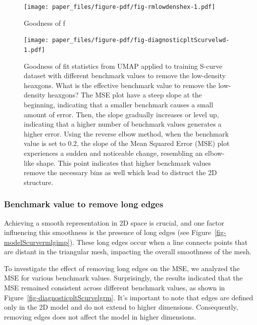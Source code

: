 \documentclass[
  12pt]{article}
\begin{document}
\begin{figure}

{\centering \texttt{[image: paper\_files/figure-pdf/fig-rmlowdenshex-1.pdf]}

}

\caption{\label{fig-rmlowdenshex}Goodness of f}

\end{figure}

\begin{figure}

{\centering \texttt{[image: paper\_files/figure-pdf/fig-diagnosticpltScurvelwd-1.pdf]}

}

\caption{\label{fig-diagnosticpltScurvelwd}Goodness of fit statistics
from UMAP applied to training S-curve dataset with different benchmark
values to remove the low-density heaxgons. What is the effective
benchmark value to remove the low-density heaxgons? The MSE plot have a
steep slope at the beginning, indicating that a smaller benchmark causes
a small amount of error. Then, the slope gradually increases or level
up, indicating that a higher number of benchmark values generates a
higher error. Using the reverse elbow method, when the benchmark value
is set to 0.2, the slope of the Mean Squared Error (MSE) plot
experiences a sudden and noticeable change, resembling an elbow-like
shape. This point indicates that higher benchmark values remove the
necessary bins as well which lead to distruct the 2D structure.}

\end{figure}

\hypertarget{benchmark-value-to-remove-long-edges}{%
\subsubsection{Benchmark value to remove long
edges}\label{benchmark-value-to-remove-long-edges}}

Achieving a smooth representation in 2D space is crucial, and one factor
influencing this smoothness is the presence of long edges (see
Figure~\ref{fig-modelScurvermlgimp}). These long edges occur when a line
connects points that are distant in the triangular mesh, impacting the
overall smoothness of the mesh.

To investigate the effect of removing long edges on the MSE, we analyzed
the MSE for various benchmark values. Surprisingly, the results
indicated that the MSE remained consistent across different benchmark
values, as shown in Figure~\ref{fig-diagnosticpltScurvelgrm}. It's
important to note that edges are defined only in the 2D model and do not
extend to higher dimensions. Consequently, removing edges does not
affect the model in higher dimensions.
\end{document}
